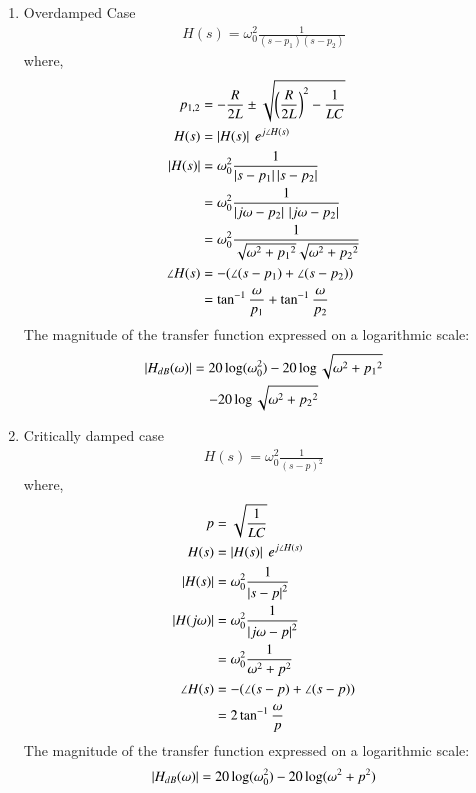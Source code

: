 \documentclass[journal,12pt,twocolumn]{IEEEtran}
\theoremstyle{remark}
\begin{document}
\begin{enumerate}
    \item Overdamped Case
    \begin{align}
        H(s)=\omega_0^2\frac{1}{(s-p_1)(s-p_2)}
    \end{align}
    where,
    \begin{align}
        p_{1,2} &= -\frac{R}{2L} \pm \sqrt{\left(\frac{R}{2L}\right)^2-\frac{1}{LC}}\\
         H(s) &= \left\vert H(s)\right\vert\ e^{j\angle{H(s)}}\\
         \left\vert H(s)\right\vert &= \omega_0^2 \frac{1}{\left\vert s-p_1\right\vert\left\vert s-p_2\right\vert}\\
         &=\omega_0^2\frac{1}{\left|j\omega-p_2\right|\,\left|j\omega-p_2\right|} \\
         &= \omega_0^2 \frac{1}{\sqrt{\omega^2+{p_1}^2}\sqrt{\omega^2+{p_2}^2}}\\
         \angle H(s) &= -(\angle(s-p_1)+\angle(s-p_2))\\
         &= \tan^{-1}\frac{\omega}{p_1} + \tan^{-1}\frac{\omega}{p_2}
    \end{align}
    The magnitude of the transfer function expressed on a logarithmic scale:
    \begin{multline}
        \left\vert H_{dB}(\omega)\right\vert = 20\log(\omega_0^2) -20\log\sqrt{\omega^2+{p_1}^2}  \\
        -20\log\sqrt{\omega^2+{p_2}^2}
    \end{multline}

    \item Critically damped case
    \begin{align}
        H(s)=\omega_0^2\frac{1}{(s-p)^2}
    \end{align}
    where,
    \begin{align}
        p &=\sqrt{\frac{1}{LC}}\\
        H(s) &= \left\vert H(s)\right\vert\ e^{j\angle{H(s)}}\\
        \left\vert H(s)\right\vert &= \omega_0^2 \frac{1}{\left\vert s-p\right\vert^2}\\
        \left\vert H(j\omega)\right\vert &=\omega_0^2 \frac{1}{\left\vert j\omega-p\right\vert^2}\\
        &=\omega_0^2\frac{1}{\omega^2+p^2}\\
        \angle H(s) &= -(\angle(s-p)+\angle(s-p))\\
         &= 2\tan^{-1}\frac{\omega}{p}
    \end{align}
    The magnitude of the transfer function expressed on a logarithmic scale:
    \begin{align}
        \left\vert H_{dB}(\omega)\right\vert = 20\log(\omega_0^2) -20\log(\omega^2+{p}^2)
    \end{align}


\end{enumerate}
\end{document}

